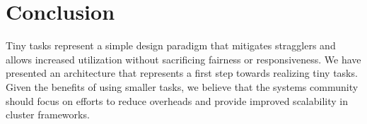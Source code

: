 \section{Conclusion}
Tiny tasks represent a simple design paradigm that mitigates stragglers and
allows increased utilization without sacrificing fairness or responsiveness.
We have presented an architecture that represents a first
step towards realizing tiny tasks.
Given the benefits of using smaller tasks, we believe that the systems
community should focus on efforts to reduce overheads and provide
improved scalability in cluster frameworks.
